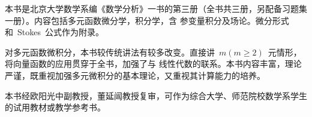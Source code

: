 

\begin{summary}
本书是北京大学数学系编《数学分析》一书的第三册（全书共三册，另配备习题集一册）。内容包括多元函数微分学，积分学，含
参变量积分及场论。微分形式和~Stokes~公式作为附录。

对多元函数微积分，本书较传统讲法有较多改变。直接讲~$m(m\geqslant 2)$~元情形，将向量函数的应用贯穿于全书，加强了与
线性代数的联系。本书内容丰富，理论严谨，既重视加强多元微积分的基本理论，又重视其计算能力的培养。

本书经欧阳光中副教授，董延闿教授复审，可作为综合大学、师范院校数学系学生的试用教材或教学参考书。
\end{summary}

\MakeVolume*

\volfrontmatter



\VolumeTOC

\volmainmatter











\begin{appendix}

\end{appendix}

\endinput
